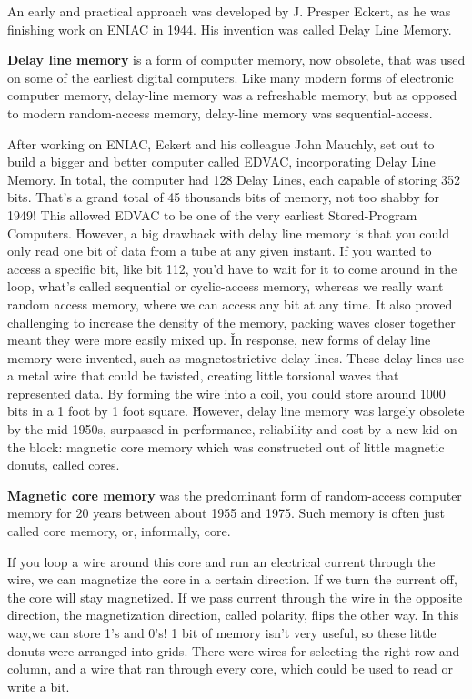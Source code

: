 An early and practical approach was developed by J. Presper Eckert, as he was finishing work on ENIAC in 1944. His
invention was called Delay Line Memory.

\textbf{Delay line memory} is a form of computer memory, now obsolete, that was used on some of the earliest digital
computers. Like many modern forms of electronic computer memory, delay-line memory was a refreshable memory, but as
opposed to modern random-access memory, delay-line memory was sequential-access.
\ed


After working on ENIAC, Eckert and his colleague John Mauchly, set out to build a bigger and better computer called
EDVAC, incorporating Delay Line Memory. In total, the computer had 128 Delay Lines, each capable of storing 352 bits.
That's a grand total of 45 thousands bits of memory, not too shabby for 1949! This allowed EDVAC to be one of the
very earliest Stored-Program Computers. \v

However, a big drawback with delay line memory is that you could only read one bit of data from a tube at any given
instant. If you wanted to access a specific bit, like bit 112, you'd have to wait for it to come around in the loop,
what's called sequential or cyclic-access memory, whereas we really want random access memory, where we can access
any bit at any time. It also proved challenging to increase the density of the memory, packing waves closer together
meant they were more easily mixed up. \v

In response, new forms of delay line memory were invented, such as magnetostrictive delay lines. These delay lines
use a metal wire that could be twisted, creating little torsional waves that represented data. By forming the wire
into a coil, you could store around 1000 bits in a 1 foot by 1 foot square. \v

However, delay line memory was largely obsolete by the mid 1950s, surpassed in performance, reliability and cost by a
new kid on the block: magnetic core memory which was constructed out of little magnetic donuts, called cores.

\textbf{Magnetic core memory} was the predominant form of random-access computer memory for 20 years between about
1955 and 1975. Such memory is often just called core memory, or, informally, core.
\ed

If you loop a wire around this core and run an electrical current through the wire, we can magnetize the core in a
certain direction. If we turn the current off, the core will stay magnetized. If we pass current through the wire in
the opposite direction, the magnetization direction, called polarity, flips the other way. In this way,we can store
1's and 0's! 1 bit of memory isn't very useful, so these little donuts were arranged into grids. There were wires for
selecting the right row and column, and a wire that ran through every core, which could be used to read or write a bit.


